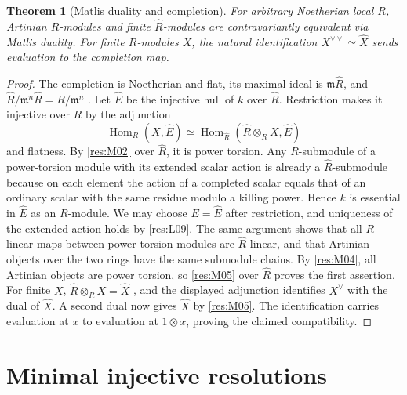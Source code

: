 \documentclass[11pt,oneside,openany]{book}
\newtheorem{theorem}{Theorem}[chapter]
\theoremstyle{definition}
\theoremstyle{remark}
\begin{document}
\begin{theorem}[Matlis duality and completion]\label{res:M06}
For arbitrary Noetherian local $R$, Artinian $R$-modules and finite
$\widehat R$-modules are contravariantly equivalent via Matlis duality.
For finite $R$-modules $X$, the natural identification
$X^{\vee\vee}\simeq \widehat X$ sends evaluation to the completion map.
\end{theorem}
\begin{proof}
The completion is Noetherian and flat, its maximal ideal is
$\mathfrak m\widehat R$, and
$\widehat R/\mathfrak m^n\widehat R=R/\mathfrak m^n$
\cite[ALG-05-C04-S01]{p103}. Let $\widehat E$ be the injective hull
of $k$ over $\widehat R$. Restriction makes it injective over $R$ by
the adjunction
\[
 \operatorname{Hom}_R(X,\widehat E)
 \simeq\operatorname{Hom}_{\widehat R}
       (\widehat R\otimes_R X,\widehat E)
\]
and flatness. By \ref{res:M02} over $\widehat R$, it is power torsion.
Any $R$-submodule of a power-torsion module with its extended scalar
action is already a $\widehat R$-submodule because on each element the action
of a completed scalar equals that of an ordinary scalar with the same
residue modulo a killing power. Hence $k$ is essential in $\widehat E$
as an $R$-module. We may choose $E=\widehat E$ after restriction, and
uniqueness of the extended action holds by \ref{res:L09}. The same
argument shows that all $R$-linear maps between power-torsion modules
are $\widehat R$-linear, and that Artinian objects over the two rings
have the same submodule chains. By \ref{res:M04}, all Artinian objects
are power torsion, so \ref{res:M05} over $\widehat R$ proves the first
assertion. For finite $X$, $\widehat R\otimes_R X=\widehat X$
\cite[ALG-05-C04-R03]{p103}, and the displayed adjunction identifies
$X^\vee$ with the dual of $\widehat X$. A second dual now gives
$\widehat X$ by \ref{res:M05}. The identification carries evaluation
at $x$ to evaluation at $1\otimes x$, proving the claimed compatibility.
\end{proof}

\section{Minimal injective resolutions}
\end{document}

